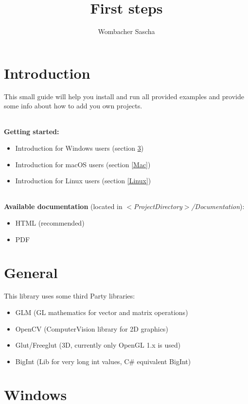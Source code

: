 \documentclass[]{article}
\title{First steps}
\author{Wombacher Sascha}
\begin{document}
\maketitle


\section{Introduction}

This small guide will help you install and run all provided examples and provide some info about how to add you own projects.

\mbox{} \\
\textbf{Getting started:}
\begin{itemize}
	\item Introduction for Windows users (section \ref{Windows})
	\item Introduction for \space macOS \space \space users (section \ref{Mac})
	\item Introduction for \space \space Linux \space \space \space users (section \ref{Linux})
\end{itemize}

\mbox{} \\
\textbf{Available documentation} (located in \textit{$<$ProjectDirectory$>$/Documentation}):
\begin{itemize}
\item HTML (recommended)
\item PDF
\end{itemize}

\section{General}
This library uses some third Party libraries:
\begin{itemize}
	\item GLM (GL mathematics for vector and matrix operations)
	\item OpenCV (ComputerVision library for 2D graphics)
	\item Glut/Freeglut (3D, currently only OpenGL 1.x is used)
	\item BigInt (Lib for very long int values, C\# equivalent BigInt)
\end{itemize}

\newpage
\section{Windows}\label{Windows}
\end{document}
